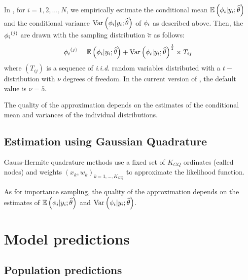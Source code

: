 In \monolix, for $i=1,2,\ldots, N$, we empirically estimate the conditional mean $\mathbb{E}\left({{\phi}_i}|y_{i};{\widehat{\theta}}\right)$ and the conditional variance $\mbox{Var}\left({{\phi}_i}|y_{i};{\widehat{\theta}}\right)$ of ${{\phi}_i}$ as described above. Then, the ${{\phi}_i}^{(j)}$ are drawn with the sampling distribution $\tilde{\pi}$ as follows:
$${{\phi}_i}^{(j)} = \mathbb{E}\left({{\phi}_i}|y_{i};{\widehat{\theta}}\right) + \mbox{Var}\left({{\phi}_i}|y_{i};{\widehat{\theta}}\right)^{\frac{1}{2}} \times T_{ij}$$
where $(T_{ij})$ is a sequence of {\it i.i.d.} random variables distributed with a $t-$distribution with $\nu$ degrees of freedom. In the current version of \monolix, the default value is $\nu=5$. 


The quality of the approximation depends on the estimates of the conditional mean and variances of the individual distributions.

\subsection{Estimation using Gaussian Quadrature} \label{sec:gqlike}


Gauss-Hermite quadrature methods use a fixed set of $K_{GQ}$ ordinates (called nodes) and weights $(x_k, w_k)_{k=1,...,K_{GQ}}$ to approximate the likelihood function.

As for importance sampling, the quality of the approximation depends on the estimates of $\mathbb{E}\left({{\phi}_i}|y_{i};{\widehat{\theta}}\right)$ and $\mbox{Var}\left({{\phi}_i}|y_{i};{\widehat{\theta}}\right)$.


\section{Model predictions} \label{section_preds}

\subsection{Population predictions}

